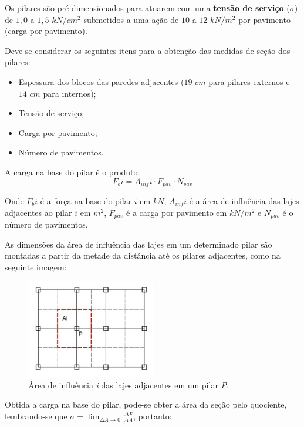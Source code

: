Os pilares são pré-dimensionados para atuarem com uma \textbf{tensão de serviço} ($\sigma$) de $1,0$ a $1,5$ $kN/cm^2$ submetidos a uma ação de $10$ a $12$ $kN/m^2$ por pavimento (carga por pavimento).

Deve-se considerar os seguintes itens para a obtenção das medidas de seção dos pilares:

\begin{itemize}
	\item Espessura dos blocos das paredes adjacentes ($19$ $cm$ para pilares externos e $14$ $cm$ para internos);
	\item Tensão de serviço;
	\item Carga por pavimento;
	\item Número de pavimentos.
\end{itemize}

A carga na base do pilar é o produto: $$F_bi = A_{inf}i \cdot F_{pav} \cdot N_{pav}$$

Onde $F_bi$ é a força na base do pilar $i$ em $kN$, $A_{inf}i$ é a área de influência das lajes adjacentes ao pilar $i$ em $m^2$, $F_{pav}$ é a carga por pavimento em $kN/m^2$ e $N_{pav}$ é o número de pavimentos.

As dimensões da área de influência das lajes em um determinado pilar são montadas a partir da metade da distância até os pilares adjacentes, como na seguinte imagem:

\begin{figure}[H]
	\begin{center}
    	\includegraphics[width=0.5\textwidth]{Pre-dimensionamento-pilares-macicos/Imagens/Area-de-influencia-das-lajes-nos-pilares.jpg}
    	\caption{Área de influência \textit{i} das lajes adjacentes em um pilar \textit{P}.}
	\end{center}
\end{figure}

Obtida a carga na base do pilar, pode-se obter a área da seção pelo quociente, lembrando-se que $\sigma = \lim_{\Delta A \rightarrow 0} \frac{\Delta F}{\Delta A}$, portanto:

